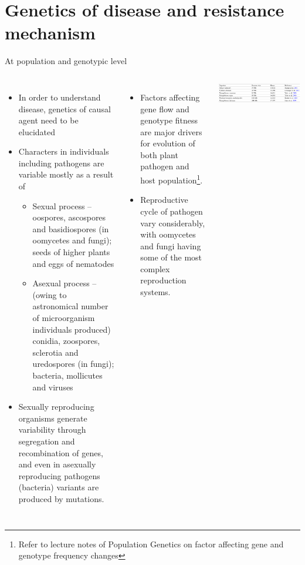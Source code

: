 \documentclass[11pt,dvipsnames,ignorenonframetext,aspectratio=169]{beamer}
\providecommand{\tightlist}{%
  \setlength{\itemsep}{0pt}\setlength{\parskip}{0pt}}
\newcommand{\bcolumns}{\begin{columns}[T, onlytextwidth]}
\newcommand{\ecolumns}{\end{columns}}
\begin{document}
\hypertarget{genetics-of-disease-and-resistance-mechanism}{%
\section{Genetics of disease and resistance
mechanism}\label{genetics-of-disease-and-resistance-mechanism}}

\begin{frame}{At population and genotypic level}
\protect\hypertarget{at-population-and-genotypic-level}{}
\bcolumns
{}
\footnotesize

\begin{itemize}
\tightlist
\item
  In order to understand disease, genetics of causal agent need to be
  elucidated
\item
  Characters in individuals including pathogens are variable mostly as a
  result of

  \begin{itemize}
  \scriptsize
  \item Sexual process -- oospores, ascospores and basidiospores (in oomycetes and fungi); seeds of higher plants and eggs of nematodes
  \item Asexual process -- (owing to astronomical number of microorganism individuals produced) conidia, zoospores, sclerotia and uredospores (in fungi); bacteria, mollicutes and viruses
  \end{itemize}
\item
  Sexually reproducing organisms generate variability through
  segregation and recombination of genes, and even in asexually
  reproducing pathogens (bacteria) variants are produced by mutations.
\end{itemize}


\footnotesize

\begin{itemize}
\tightlist
\item
  Factors affecting gene flow and genotype fitness are major drivers for
  evolution of both plant pathogen and host
  population\footnote[frame]{\scriptsize Refer to lecture notes of Population Genetics on factor affecting gene and genotype frequency changes}.
\item
  Reproductive cycle of pathogen vary considerably, with oomycetes and
  fungi having some of the most complex reproduction systems.
\end{itemize}

\includegraphics[width=0.88\linewidth]{../images/genome-complexity-comparison-oomycete}

\ecolumns
\end{frame}
\end{document}
